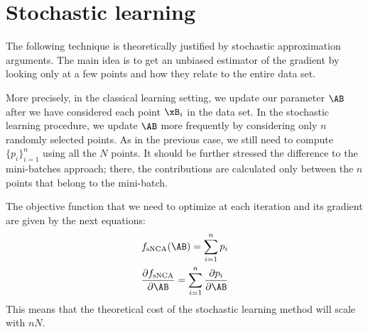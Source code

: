 

\section{Stochastic learning}
\label{sec:stochastic-learning}

The following technique is theoretically justified by stochastic approximation
arguments. The main idea is to get an unbiased estimator of the gradient by
looking only at a few points and how they relate to the entire data set.

More precisely, in the classical learning setting, we update our parameter $\AB$
after we have considered each point $\xB_i$ in the data set. In the stochastic
learning procedure, we update $\AB$ more frequently by considering only $n$
randomly selected points. As in the previous case, we still need to compute
$\{p_i\}_{i=1}^n$ using all the $N$ points. It should be further stressed the
difference to the mini-batches approach; there, the contributions are calculated
only between the $n$ points that belong to the mini-batch. 

The objective function that we need to optimize at each iteration and its
gradient are given by the next equations:
\begin{align}
	f_\text{sNCA}(\AB) = \sum_{i=1}^n p_i\\
	\frac{\partial f_\text{sNCA}}{\partial \AB} = \sum_{i=1}^{n} \frac{\partial
p_i}{\partial \AB}
	\label{eq:snca-grad}
\end{align}
This means that the theoretical cost of the stochastic learning method will
scale with $nN$.

